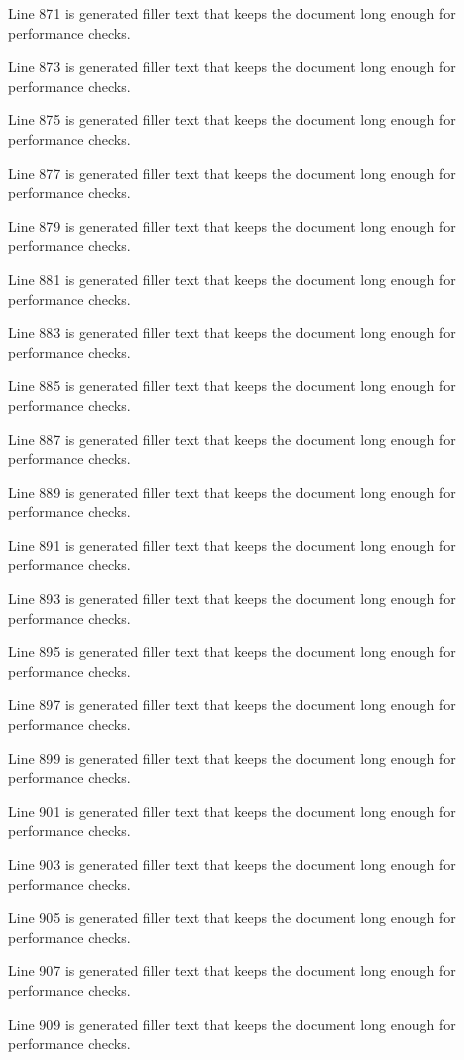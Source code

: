 Line 871 is generated filler text that keeps the document long enough for performance checks.

Line 873 is generated filler text that keeps the document long enough for performance checks.

Line 875 is generated filler text that keeps the document long enough for performance checks.

Line 877 is generated filler text that keeps the document long enough for performance checks.

Line 879 is generated filler text that keeps the document long enough for performance checks.

Line 881 is generated filler text that keeps the document long enough for performance checks.

Line 883 is generated filler text that keeps the document long enough for performance checks.

Line 885 is generated filler text that keeps the document long enough for performance checks.

Line 887 is generated filler text that keeps the document long enough for performance checks.

Line 889 is generated filler text that keeps the document long enough for performance checks.

Line 891 is generated filler text that keeps the document long enough for performance checks.

Line 893 is generated filler text that keeps the document long enough for performance checks.

Line 895 is generated filler text that keeps the document long enough for performance checks.

Line 897 is generated filler text that keeps the document long enough for performance checks.

Line 899 is generated filler text that keeps the document long enough for performance checks.

Line 901 is generated filler text that keeps the document long enough for performance checks.

Line 903 is generated filler text that keeps the document long enough for performance checks.

Line 905 is generated filler text that keeps the document long enough for performance checks.

Line 907 is generated filler text that keeps the document long enough for performance checks.

Line 909 is generated filler text that keeps the document long enough for performance checks.

